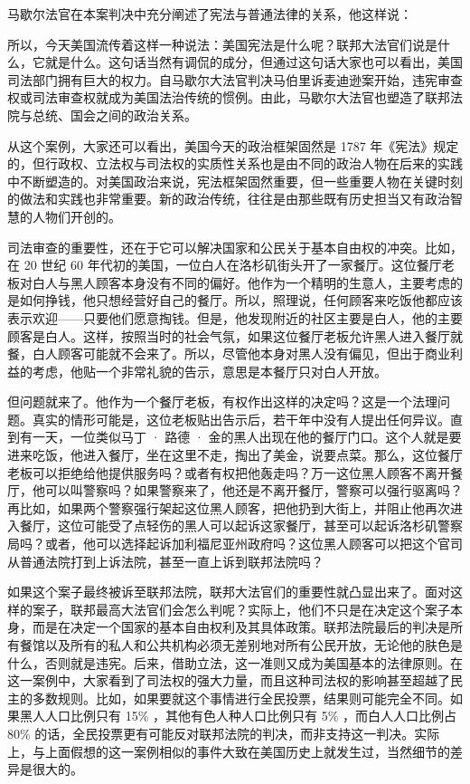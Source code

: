 马歇尔法官在本案判决中充分阐述了宪法与普通法律的关系，他这样说：


所以，今天美国流传着这样一种说法：美国宪法是什么呢？联邦大法官们说是什么，它就是什么。这句话当然有调侃的成分，但通过这句话大家也可以看出，美国司法部门拥有巨大的权力。自马歇尔大法官判决马伯里诉麦迪逊案开始，违宪审查权或司法审查权就成为美国法治传统的惯例。由此，马歇尔大法官也塑造了联邦法院与总统、国会之间的政治关系。

从这个案例，大家还可以看出，美国今天的政治框架固然是 1787 年《宪法》规定的，但行政权、立法权与司法权的实质性关系也是由不同的政治人物在后来的实践中不断塑造的。对美国政治来说，宪法框架固然重要，但一些重要人物在关键时刻的做法和实践也非常重要。新的政治传统，往往是由那些既有历史担当又有政治智慧的人物们开创的。

司法审查的重要性，还在于它可以解决国家和公民关于基本自由权的冲突。比如，在 20 世纪 60 年代初的美国，一位白人在洛杉矶街头开了一家餐厅。这位餐厅老板对白人与黑人顾客本身没有不同的偏好。他作为一个精明的生意人，主要考虑的是如何挣钱，他只想经营好自己的餐厅。所以，照理说，任何顾客来吃饭他都应该表示欢迎——只要他们愿意掏钱。但是，他发现附近的社区主要是白人，他的主要顾客是白人。这样，按照当时的社会气氛，如果这位餐厅老板允许黑人进入餐厅就餐，白人顾客可能就不会来了。所以，尽管他本身对黑人没有偏见，但出于商业利益的考虑，他贴一个非常礼貌的告示，意思是本餐厅只对白人开放。

但问题就来了。他作为一个餐厅老板，有权作出这样的决定吗？这是一个法理问题。真实的情形可能是，这位老板贴出告示后，若干年中没有人提出任何异议。直到有一天，一位类似马丁 · 路德 · 金的黑人出现在他的餐厅门口。这个人就是要进来吃饭，他进入餐厅，坐在这里不走，掏出了美金，说要点菜。那么，这位餐厅老板可以拒绝给他提供服务吗？或者有权把他轰走吗？万一这位黑人顾客不离开餐厅，他可以叫警察吗？如果警察来了，他还是不离开餐厅，警察可以强行驱离吗？再比如，如果两个警察强行架起这位黑人顾客，把他扔到大街上，并阻止他再次进入餐厅，这位可能受了点轻伤的黑人可以起诉这家餐厅，甚至可以起诉洛杉矶警察局吗？或者，他可以选择起诉加利福尼亚州政府吗？这位黑人顾客可以把这个官司从普通法院打到上诉法院，甚至一直上诉到联邦法院吗？

如果这个案子最终被诉至联邦法院，联邦大法官们的重要性就凸显出来了。面对这样的案子，联邦最高大法官们会怎么判呢？实际上，他们不只是在决定这个案子本身，而是在决定一个国家的基本自由权利及其具体政策。联邦法院最后的判决是所有餐馆以及所有的私人和公共机构必须无差别地对所有公民开放，无论他的肤色是什么，否则就是违宪。后来，借助立法，这一准则又成为美国基本的法律原则。在这一案例中，大家看到了司法权的强大力量，而且这种司法权的影响甚至超越了民主的多数规则。比如，如果要就这个事情进行全民投票，结果则可能完全不同。如果黑人人口比例只有 15\% ，其他有色人种人口比例只有 5\% ，而白人人口比例占 80\% 的话，全民投票更有可能反对联邦法院的判决，而非支持这一判决。实际上，与上面假想的这一案例相似的事件大致在美国历史上就发生过，当然细节的差异是很大的。

